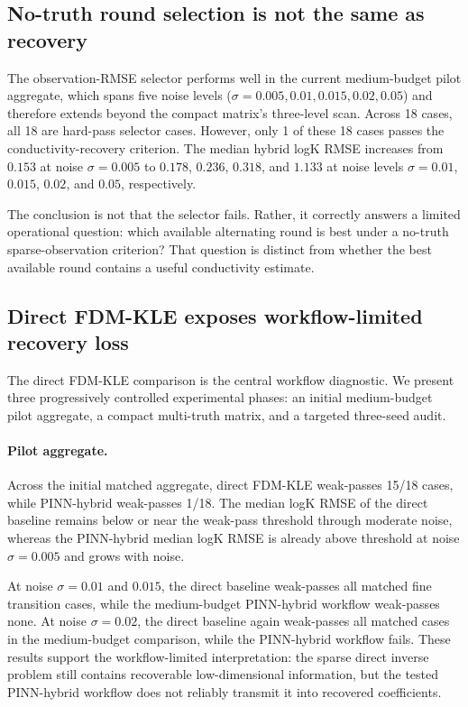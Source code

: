 \documentclass[pdflatex,sn-mathphys,Numbered,iicol]{sn-jnl}
\begin{document}
\subsection{No-truth round selection is not the same as recovery}
\label{sec:res-selector}

The observation-RMSE selector performs well in the current medium-budget pilot
aggregate, which spans five noise levels ($\sigma=0.005,0.01,0.015,0.02,0.05$)
and therefore extends beyond the compact matrix's three-level scan. Across 18
cases, all 18 are hard-pass selector cases. However,
only 1 of these 18 cases passes the conductivity-recovery criterion. The
median hybrid logK RMSE increases from $0.153$ at noise $\sigma=0.005$ to
$0.178$, $0.236$, $0.318$, and $1.133$ at noise levels $\sigma=0.01$,
$0.015$, $0.02$, and $0.05$, respectively.

The conclusion is not that the selector fails. Rather, it correctly answers a
limited operational question: which available alternating round is best under a
no-truth sparse-observation criterion? That question is distinct from whether
the best available round contains a useful conductivity estimate.

\subsection{Direct FDM-KLE exposes workflow-limited recovery loss}
\label{sec:res-baseline}

The direct FDM-KLE comparison is the central workflow diagnostic. We present
three progressively controlled experimental phases: an initial medium-budget
pilot aggregate, a compact multi-truth matrix, and a targeted three-seed
audit.

\paragraph{Pilot aggregate.}
Across the initial matched aggregate, direct FDM-KLE weak-passes 15/18 cases,
while PINN-hybrid weak-passes 1/18. The median logK RMSE of the direct
baseline remains below or near the weak-pass threshold through moderate noise,
whereas the PINN-hybrid median logK RMSE is already above threshold at noise
$\sigma=0.005$ and grows with noise.

At noise $\sigma=0.01$ and $0.015$, the direct baseline weak-passes all
matched fine transition cases, while the medium-budget PINN-hybrid workflow
weak-passes none. At noise $\sigma=0.02$, the direct baseline again
weak-passes all matched cases in the medium-budget comparison, while the
PINN-hybrid workflow fails. These results support the workflow-limited
interpretation: the sparse direct inverse problem still contains recoverable
low-dimensional information, but the tested PINN-hybrid workflow does not
reliably transmit it into recovered coefficients.
\end{document}
